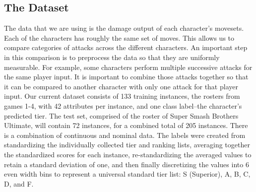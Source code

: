 \documentclass{article}
\begin{document}
\subsection{The Dataset}
 The data that we are using is the damage output of each character’s movesets. Each of the characters has roughly the same set of moves. This allows us to compare categories of attacks across the different characters. An important step in this comparison is to preprocess the data so that they are uniformly measurable. For example, some characters perform multiple successive attacks for the same player input. It is important to combine those attacks together so that it can be compared to another character with only one attack for that player input.
Our current dataset consists of 133 training instances, the rosters from games 1-4, with 42 attributes per instance, and one class label--the character’s predicted tier. The test set, comprised of the roster of Super Smash Brothers Ultimate, will contain 72 instances, for a combined total of 205 instances. There is a combination of continuous and nominal data. 
The labels were created from standardizing the individually collected tier and ranking lists, averaging together the standardized scores for each instance, re-standardizing the averaged values to retain a standard deviation of one, and then finally discretizing the values into 6 even width bins to represent a universal standard tier list: S (Superior), A, B, C, D, and F.
\end{document}
